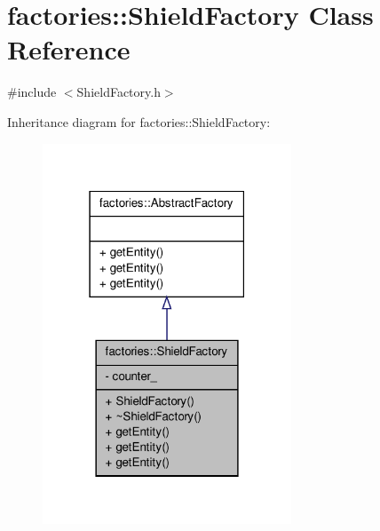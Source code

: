 \hypertarget{classfactories_1_1ShieldFactory}{\section{factories\-:\-:\-Shield\-Factory \-Class \-Reference}
\label{df/d2f/classfactories_1_1ShieldFactory}
}


{\ttfamily \#include $<$\-Shield\-Factory.\-h$>$}



\-Inheritance diagram for factories\-:\-:\-Shield\-Factory\-:
\nopagebreak
\begin{figure}[H]
\begin{center}
\leavevmode
\includegraphics[width=210pt]{d4/dbf/classfactories_1_1ShieldFactory__inherit__graph}
\end{center}
\end{figure}


